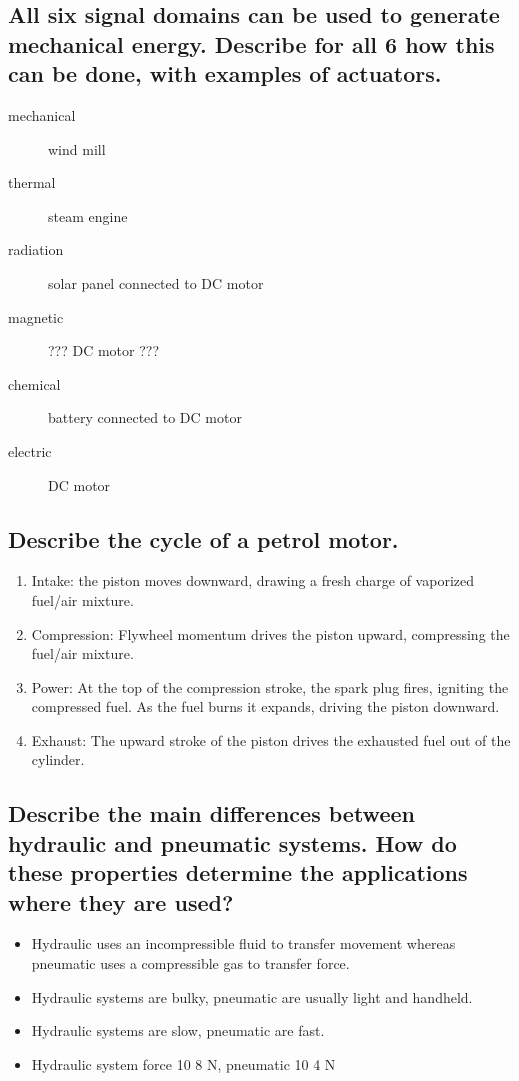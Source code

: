 \documentclass[10pt,a4paper]{article}
\begin{document}
\subsection{All six signal domains can be used to generate mechanical energy. Describe for all 6 how this can be done, with examples of actuators.}

\begin{description}
	\item[mechanical] wind mill
	\item[thermal] steam engine
	\item[radiation] solar panel connected to DC motor
	\item[magnetic] ??? DC motor ???
	\item[chemical] battery connected to DC motor
	\item[electric] DC motor
\end{description}

\subsection{Describe the cycle of a petrol motor.}

\begin{enumerate}
	\item Intake: the piston moves downward, drawing a fresh charge of vaporized fuel/air mixture.
	\item Compression: Flywheel momentum drives the piston upward, compressing the fuel/air mixture.
	\item Power: At the top of the compression stroke, the spark plug fires, igniting the compressed fuel. As the fuel burns it expands, driving the piston downward.
	\item Exhaust: The upward stroke of the piston drives the exhausted fuel out of the cylinder.
\end{enumerate}

\subsection{Describe the main differences between hydraulic and pneumatic systems. How do these properties determine the
applications where they are used?}

\begin{itemize}
	\item Hydraulic uses an incompressible fluid to transfer movement whereas pneumatic uses a compressible gas to transfer force.
	\item Hydraulic systems are bulky, pneumatic are usually light and handheld.
	\item Hydraulic systems are slow, pneumatic are fast.
	\item Hydraulic system force 10 8 N, pneumatic 10 4 N
\end{itemize}
\end{document}
